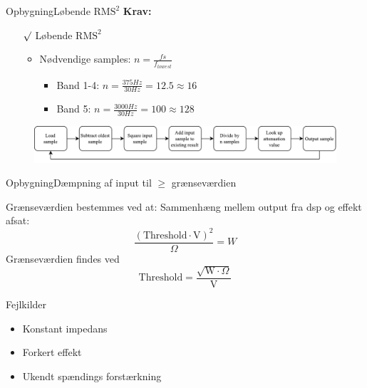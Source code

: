 \begin{frame}{Opbygning}{Løbende $\text{RMS}^2$}
\textbf{Krav:}
\begin{itemize}
\item[$\surd$] Løbende $\text{RMS}^2$
\begin{itemize}
\item Nødvendige samples: $n = \frac{fs}{f_{lowest}}$
\begin{itemize}
\item Band 1-4: $n = \frac{375 Hz}{30 Hz} = 12.5 \approx 16$
\item Band 5: $n = \frac{3000 Hz}{30 Hz} = 100 \approx 128$
\end{itemize}
\end{itemize}
\end{itemize}
\begin{figure}
\includegraphics[width=1\textwidth]{Compressor}
\end{figure} 
\end{frame}


\begin{frame}{Opbygning}{Dæmpning af input til $\geq$ grænseværdien}
\begin{block}{Grænseværdien bestemmes ved at:}
Sammenhæng mellem output fra dsp og effekt afsat:\\
$$ \frac{(\text{Threshold} \cdot \text{V})^2}{\Omega} = W $$
Grænseværdien findes ved $$\text{Threshold} = \frac{\sqrt{\text{W} \cdot \Omega}}{\text{V}}$$
\end{block}

\begin{block}{\alert{Fejlkilder}}
\begin{itemize}
	\item Konstant impedans
	\item Forkert effekt
	\item Ukendt spændings forstærkning
\end{itemize}
\end{block}

%

\end{frame}

